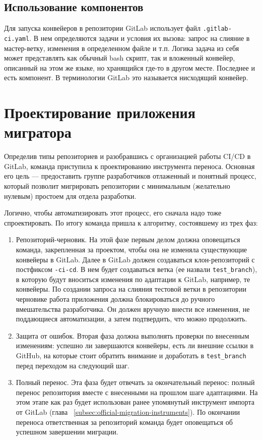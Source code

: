 \subsection{Использование компонентов} \label{subsec:component-usage}
Для запуска конвейеров в репозитории GitLab использует файл \texttt{.gitlab-ci.yaml}\cite{gitlab-ci-yaml}.
В нем определяются задачи и условия их вызова: запрос на слияние в мастер-ветку, изменения в определенном файле и т.п.
Логика задача из себя может представлять как обычный bash скрипт\cite{bash}, так и вложенный конвейер, описанный на этом же языке,
но хранящийся где-то в другом месте.
Последнее и есть компонент.
В терминологии GitLab это называется нисходящий конвейер\cite{downstream-pipeline}.

\section{Проектирование приложения мигратора} \label{sec:gitlab-migrator-app}

Определив типы репозиториев и разобравшись с организацией работы CI/CD в GitLab, команда приступила к проектированию инструмента переноса.
Основная его цель — предоставить группе разработчиков отлаженный и понятный процесс,
который позволит мигрировать репозитории с минимальным (желательно нулевым) простоем для отдела разработки.

Логично, чтобы автоматизировать этот процесс, его сначала надо тоже спроектировать.
По итогу команда пришла к алгоритму, состоявшему из трех фаз:
\begin{enumerate}
  \item Репозиторий-черновик.
        На этой фазе первым делом должна оповещаться команда, закрепленная за проектом, чтобы она не изменяла существующие конвейеры в GitLab.
        Далее в GitLab должен создаваться клон-репозиторий с постфиксом \texttt{-ci-cd}.
        В нем будет создаваться ветка (ее назвали \texttt{test\_branch}), в которую будут вноситься изменения по адаптации к GitLab, например, те конвейеры.
        По создании запроса на слияния тестовой ветки в репозитории черновике работа приложения должна блокироваться до ручного вмешательства разработчика.
        Он должен вручную внести все изменения, не поддающиеся автоматизации, а затем подтвердить, что можно продолжить.
  \item Защита от ошибок.
        Вторая фаза должна выполнять проверки по внесенным изменениям: успешно ли завершаются конвейеры, есть ли внешние ссылки в GitHub,
        на которые стоит обратить внимание и доработать в \texttt{test\_branch} перед переходом на следующий шаг.
  \item Полный перенос.
        Эта фаза будет отвечать за окончательный перенос: полный перенос репозитория вместе с внесенными на прошлом шаге адаптациями.
        На этом этапе как раз будет использован ранее упомянутый инструмент импорта от GitLab (глава ~\ref{subsec:official-migration-instruments}).
        По окончании переноса ответственная за репозиторий команда будет оповещаться об успешном завершении миграции.
\end{enumerate}

